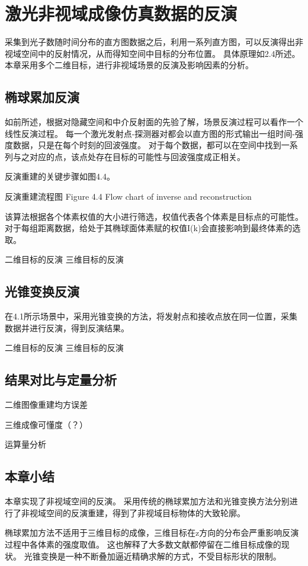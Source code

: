 \chapter{激光非视域成像仿真数据的反演}\label{chap:Simulation}
采集到光子数随时间分布的直方图数据之后，利用一系列直方图，可以反演得出非视域空间中的反射情况，从而得知空间中目标的分布位置。
具体原理如2.4所述。
本章采用多个二维目标，进行非视域场景的反演及影响因素的分析。

\section{椭球累加反演}
如前所述，根据对隐藏空间和中介反射面的先验了解，场景反演过程可以看作一个线性反演过程。
每一个激光发射点-探测器对都会以直方图的形式输出一组时间-强度数据，只是在每个时刻的回波强度。
对于每个数据，都可以在空间中找到一系列与之对应的点，该点处存在目标的可能性与回波强度成正相关。

反演重建的关键步骤如图4.4。


 
反演重建流程图
Figure 4.4 Flow chart of inverse and reconstruction

该算法根据各个体素权值的大小进行筛选，权值代表各个体素是目标点的可能性。
对于每组距离数据，给处于其椭球面体素赋的权值I(k)会直接影响到最终体素的选取。

二维目标的反演
三维目标的反演
\section{光锥变换反演}
在4.1所示场景中，采用光锥变换的方法，将发射点和接收点放在同一位置，采集数据并进行反演，得到反演结果。

二维目标的反演
三维目标的反演
 
\section{结果对比与定量分析}
二维图像重建均方误差



三维成像可懂度（？）	

运算量分析
\section{本章小结}
本章实现了非视域空间的反演。
采用传统的椭球累加方法和光锥变换方法分别进行了非视域空间的反演重建，得到了非视域目标物体的大致轮廓。

椭球累加方法不适用于三维目标的成像，三维目标在z方向的分布会严重影响反演过程中各体素的强度取值。
这也解释了大多数文献都停留在二维目标成像的现状。
光锥变换是一种不断叠加逼近精确求解的方式，不受目标形状的限制。
 
